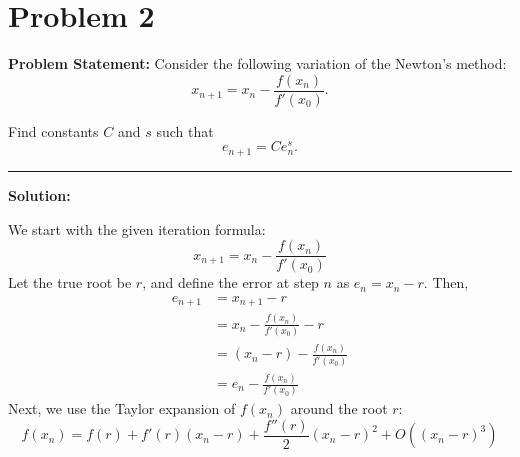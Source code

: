 \clearpage
\section*{Problem 2}

\textbf{Problem Statement:} Consider the following variation of the Newton's method:
$$x_{n+1} = x_n - \frac{f(x_n)}{f'(x_0)}.$$

Find constants $C$ and $s$ such that
$$e_{n+1} = Ce_n^s.$$

\noindent\rule{\textwidth}{0.4pt}

\vspace{1em}

\textbf{Solution:}

We start with the given iteration formula:
\begin{equation*}
    x_{n+1} = x_n - \frac{f(x_n)}{f'(x_0)}
\end{equation*}
Let the true root be $r$, and define the error at step $n$ as $e_n = x_n - r$. Then,
\begin{align*}
    e_{n+1} &= x_{n+1} - r \\
    &= x_n - \frac{f(x_n)}{f'(x_0)} - r \\
    &= (x_n - r) - \frac{f(x_n)}{f'(x_0)} \\
    &= e_n - \frac{f(x_n)}{f'(x_0)}
\end{align*}
Next, we use the Taylor expansion of $f(x_n)$ around the root $r$:
\begin{equation*}
    f(x_n) = f(r) + f'(r)(x_n - r) + \frac{f''(r)}{2}(x_n - r)^2 + O((x_n - r)^3)
\end{equation*}

